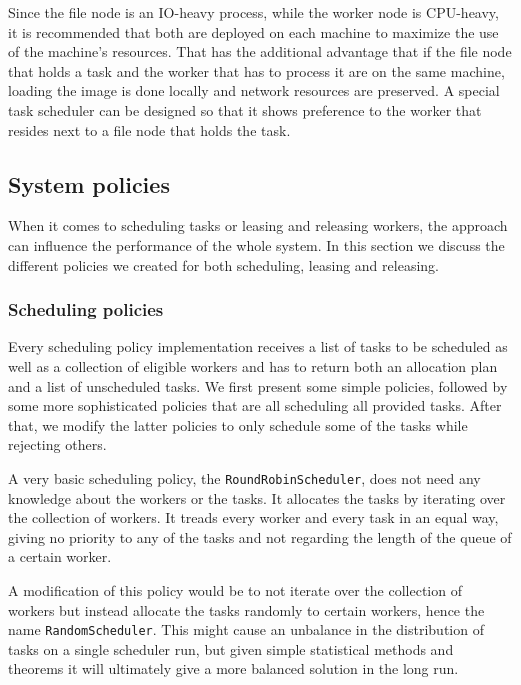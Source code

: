\documentclass{stylesheet}
\begin{document}
Since the file node is an IO-heavy process, while the worker node is CPU-heavy, it is recommended that both are deployed on each machine to maximize the use of the machine's resources. That has the additional advantage that if the file node that holds a task and the worker that has to process it are on the same machine, loading the image is done locally and network resources are preserved. A special task scheduler can be designed so that it shows preference to the worker that resides next to a file node that holds the task.

\subsection{System policies}
\label{subsec:policies}
When it comes to scheduling tasks or leasing and releasing workers, the approach can influence the performance of the whole system. In this section we discuss the different policies we created for both scheduling, leasing and releasing.

\subsubsection*{Scheduling policies}
Every scheduling policy implementation receives a list of tasks to be scheduled as well as a collection of eligible workers and has to return both an allocation plan and a list of unscheduled tasks. We first present some simple policies, followed by some more sophisticated policies that are all scheduling all provided tasks. After that, we modify the latter policies to only schedule some of the tasks while rejecting others.

A very basic scheduling policy, the \texttt{RoundRobinScheduler}, does not need any knowledge about the workers or the tasks. It allocates the tasks by iterating over the collection of workers. It treads every worker and every task in an equal way, giving no priority to any of the tasks and not regarding the length of the queue of a certain worker.

A modification of this policy would be to not iterate over the collection of workers but instead allocate the tasks randomly to certain workers, hence the name \texttt{RandomScheduler}. This might cause an unbalance in the distribution of tasks on a single scheduler run, but given simple statistical methods and theorems it will ultimately give a more balanced solution in the long run.
\end{document}
